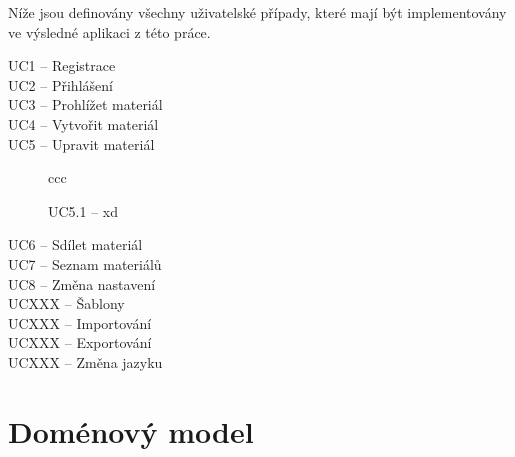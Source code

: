 Níže jsou definovány všechny uživatelské případy, které mají být implementovány ve výsledné aplikaci z této práce.

\begin{description}
    \item[UC1 -- Registrace]
    \item[UC2 -- Přihlášení]
    \item[UC3 -- Prohlížet materiál] 
    \item[UC4 -- Vytvořit materiál]
    \item[UC5 -- Upravit materiál] ccc
        \begin{description}
            \item[UC5.1 -- xd] 
        \end{description}
    \item[UC6 -- Sdílet materiál]
    \item[UC7 -- Seznam materiálů] 
    \item[UC8 -- Změna nastavení]
    
    
    \item[UCXXX -- Šablony]
    \item[UCXXX -- Importování]
    \item[UCXXX -- Exportování]
    \item[UCXXX -- Změna jazyku]
\end{description}

\section{Doménový model}